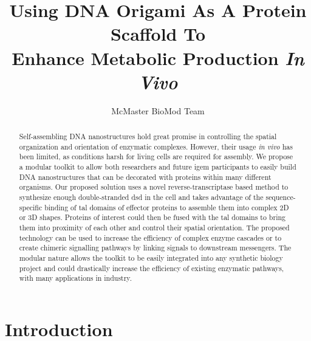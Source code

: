 \documentclass[a4paper]{article}
\title{Using DNA Origami As A Protein Scaffold To \\ Enhance Metabolic Production \textit{In Vivo}}
\author{McMaster BioMod Team}
\date{}
\begin{document}
\maketitle
\thispagestyle{fancy}
\pagestyle{fancy}
\begin{abstract}
Self-assembling DNA nanostructures hold great promise in controlling the spatial organization and orientation of enzymatic complexes.
However, their usage \textit{in vivo} has been limited, as conditions harsh for living cells are required for assembly.
We propose a modular toolkit to allow both researchers and future \ac{igem} participants to easily build DNA nanostructures that can be decorated with proteins within many different organisms.
Our proposed solution uses a novel reverse-transcriptase based method to synthesize enough double-stranded \ac{dsd} in the cell and takes advantage of the sequence-specific binding of \ac{tal} domains of  effector proteins to assemble them into complex 2D or 3D shapes.
Proteins of interest could then be fused with the \ac{tal} domains to bring them into proximity of each other and control their spatial orientation.
The proposed technology can be used to increase the efficiency of complex enzyme cascades or to create chimeric signalling pathways by linking signals to downstream messengers.
The modular nature allows the toolkit to be easily integrated into any synthetic biology project and could drastically increase the efficiency of existing enzymatic pathways, with many applications in industry.
\end{abstract}
\section*{Introduction}
\end{document}
